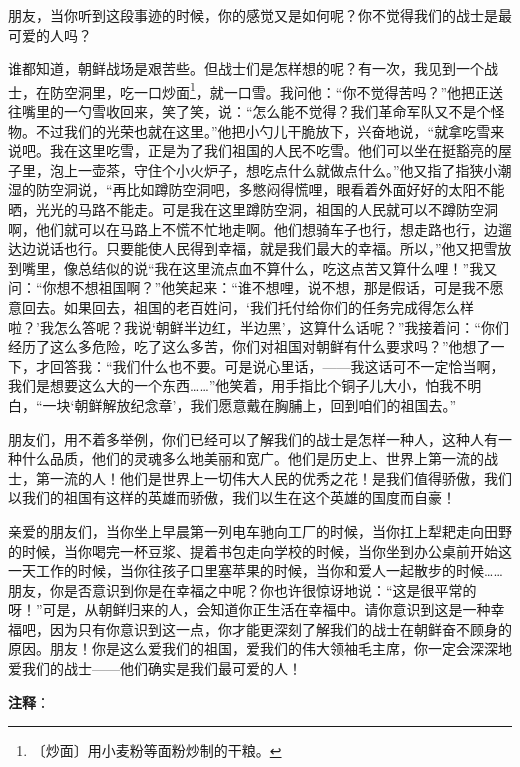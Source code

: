\documentclass[12pt,UTF-8,openany]{ctexbook}
\begin{document}
\begin{large}
    朋友，当你听到这段事迹的时候，你的感觉又是如何呢？你不觉得我们的战士是最可爱的人吗？
    
    谁都知道，朝鲜战场是艰苦些。但战士们是怎样想的呢？有一次，我见到一个战士，在防空洞里，吃一口炒面\footnote{〔炒面〕用小麦粉等面粉炒制的干粮。}，就一口雪。我问他：“你不觉得苦吗？”他把正送往嘴里的一勺雪收回来，笑了笑，说：“怎么能不觉得？我们革命军队又不是个怪物。不过我们的光荣也就在这里。”他把小勺儿干脆放下，兴奋地说，“就拿吃雪来说吧。我在这里吃雪，正是为了我们祖国的人民不吃雪。他们可以坐在挺豁亮的屋子里，泡上一壶茶，守住个小火炉子，想吃点什么就做点什么。”他又指了指狭小潮湿的防空洞说，“再比如蹲防空洞吧，多憋闷得慌哩，眼看着外面好好的太阳不能晒，光光的马路不能走。可是我在这里蹲防空洞，祖国的人民就可以不蹲防空洞啊，他们就可以在马路上不慌不忙地走啊。他们想骑车子也行，想走路也行，边遛达边说话也行。只要能使人民得到幸福，就是我们最大的幸福。所以，”他又把雪放到嘴里，像总结似的说“我在这里流点血不算什么，吃这点苦又算什么哩！”我又问：“你想不想祖国啊？”他笑起来：“谁不想哩，说不想，那是假话，可是我不愿意回去。如果回去，祖国的老百姓问，‘我们托付给你们的任务完成得怎么样啦？’我怎么答呢？我说‘朝鲜半边红，半边黑’，这算什么话呢？”我接着问：“你们经历了这么多危险，吃了这么多苦，你们对祖国对朝鲜有什么要求吗？”他想了一下，才回答我：“我们什么也不要。可是说心里话，——我这话可不一定恰当啊，我们是想要这么大的一个东西……”他笑着，用手指比个铜子儿大小，怕我不明白，“一块‘朝鲜解放纪念章’，我们愿意戴在胸脯上，回到咱们的祖国去。”
    
    朋友们，用不着多举例，你们已经可以了解我们的战士是怎样一种人，这种人有一种什么品质，他们的灵魂多么地美丽和宽广。他们是历史上、世界上第一流的战士，第一流的人！他们是世界上一切伟大人民的优秀之花！是我们值得骄傲，我们以我们的祖国有这样的英雄而骄傲，我们以生在这个英雄的国度而自豪！
    
    亲爱的朋友们，当你坐上早晨第一列电车驰向工厂的时候，当你扛上犁耙走向田野的时候，当你喝完一杯豆浆、提着书包走向学校的时候，当你坐到办公桌前开始这一天工作的时候，当你往孩子口里塞苹果的时候，当你和爱人一起散步的时候……朋友，你是否意识到你是在幸福之中呢？你也许很惊讶地说：“这是很平常的呀！”可是，从朝鲜归来的人，会知道你正生活在幸福中。请你意识到这是一种幸福吧，因为只有你意识到这一点，你才能更深刻了解我们的战士在朝鲜奋不顾身的原因。朋友！你是这么爱我们的祖国，爱我们的伟大领袖毛主席，你一定会深深地爱我们的战士——他们确实是我们最可爱的人！
    
\end{large}


\newpage

\textbf{注释}：
\end{document}
